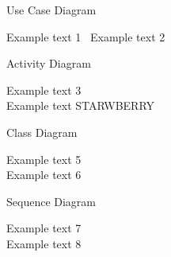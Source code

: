 \documentclass{article}
\begin{document}
	\begin{figure}[htbp]
		\centering
		\begin{subfigure}{\textwidth}
			\resizebox{\textwidth}{!}{}
			\caption{Use Case Diagram}
		\end{subfigure}
		\begin{subfigure}{\textwidth}
			Example text 1 \
			Example text 2
		\end{subfigure}
	\end{figure}
	
	\begin{figure}[htbp]
		\centering
		\begin{subfigure}{\textwidth}
			\resizebox{\textwidth}{!}{}
			\caption{Activity Diagram}
		\end{subfigure}
		\begin{subfigure}{\textwidth}
			Example text 3 \\
			Example text STARWBERRY 
		\end{subfigure}
	\end{figure}
	
	\begin{figure}[htbp]
		\centering
		\begin{subfigure}{\textwidth}
			\resizebox{\textwidth}{!}{}
			\caption{Class Diagram}
		\end{subfigure}
		\begin{subfigure}{\textwidth}
			Example text 5 \\
			Example text 6 
		\end{subfigure}
	\end{figure}
	
	\begin{figure}[htbp]
		\centering
		\begin{subfigure}{\textwidth}
			\resizebox{\textwidth}{!}{}
			\caption{Sequence Diagram}
		\end{subfigure}
		\begin{subfigure}{\textwidth}
			Example text 7 \\
			Example text 8
		\end{subfigure}
	\end{figure}
\newpage
\end{document}
